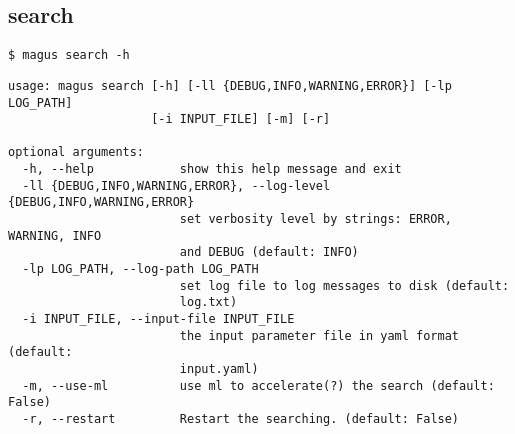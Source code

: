 \documentclass[12pt,oneside]{book}
\begin{document}
\subsection{search}
\begin{tcolorbox}
    \begin{verbatim}
$ magus search -h
    \end{verbatim}
    \tcblower
    \begin{verbatim}
usage: magus search [-h] [-ll {DEBUG,INFO,WARNING,ERROR}] [-lp LOG_PATH]
                    [-i INPUT_FILE] [-m] [-r]

optional arguments:
  -h, --help            show this help message and exit
  -ll {DEBUG,INFO,WARNING,ERROR}, --log-level {DEBUG,INFO,WARNING,ERROR}
                        set verbosity level by strings: ERROR, WARNING, INFO
                        and DEBUG (default: INFO)
  -lp LOG_PATH, --log-path LOG_PATH
                        set log file to log messages to disk (default:
                        log.txt)
  -i INPUT_FILE, --input-file INPUT_FILE
                        the input parameter file in yaml format (default:
                        input.yaml)
  -m, --use-ml          use ml to accelerate(?) the search (default: False)
  -r, --restart         Restart the searching. (default: False)
    \end{verbatim}
\end{tcolorbox}
\end{document}
